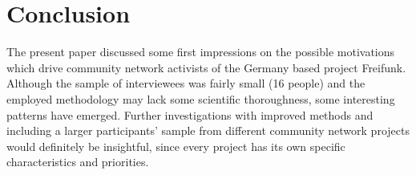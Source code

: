 \section{Conclusion}

The present paper discussed some first impressions on the possible motivations which drive community network activists of the Germany based project Freifunk.
Although the sample of interviewees was fairly small (16 people) and the employed methodology may lack some scientific thoroughness, some interesting patterns have emerged.
Further investigations with improved methods and including a larger participants' sample from different community network projects would definitely be insightful, since every project has its own specific characteristics and priorities.


\begin{comment}
* an investigation of further community network projects would definitely be insightful, since all of them have sometimes quite different aspects, ideas, definitions, motivations

* not clear whether such a comparison is really valid: methods for gathering results in both domains vary widely

* Die Papers beschäftigen sich (vor allem) mit der Motivation von Entwickler*innen. Allerdings gibt es auch andere Möglichkeiten zu beiden Communities beizutragen (user documentation, publicity, design, Übersetzung, ...). Kann man sich da andere Motivationen vorstellen?

* critical discussion of the own methodology
\end{comment}
